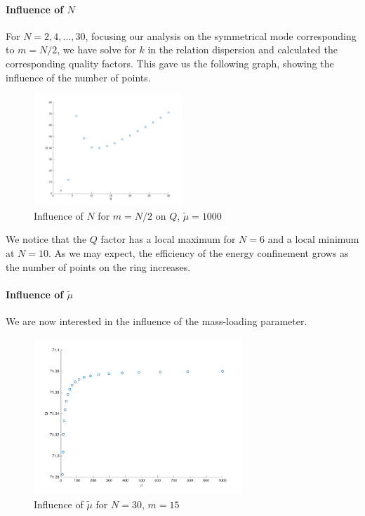 \documentclass[11pt]{report}
\numberwithin{equation}{section}
\begin{document}
\paragraph{Influence of $N$} For $N = 2,4,\ldots,30$, focusing our analysis on the symmetrical mode corresponding to $m=N/2$, we have solve for $k$ in the relation dispersion and calculated the corresponding quality factors. This gave us the following graph, showing the influence of the number of points.

\begin{figure} [H]
    \centering
    \includegraphics[width = 0.5\textwidth]{Influence_of_N}
    \caption{Influence of $N$ for $m=N/2$ on $Q$, $\tilde \mu = 1000$}
    \label{fig:my_label}
\end{figure}

\noindent
We notice that the $Q$ factor has a local maximum for $N=6$ and a local minimum at $N=10$. As we may expect, the efficiency of the energy confinement grows as the number of points on the ring increases.

\paragraph{Influence of $\tilde \mu$} We are now interested in the influence of the mass-loading parameter.

\begin{figure} [H]
    \centering
    \includegraphics[width = 0.7\textwidth]{Influence_of_mu}
    \caption{Influence of $\tilde \mu$ for $N=30$, $m=15$}
    \label{fig:my_label}
\end{figure}
\end{document}
